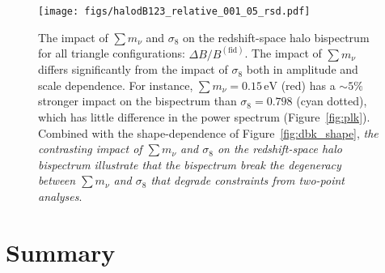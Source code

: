 \documentclass[12pt, letterpaper, preprint]{aastex62}
\newcommand{\smnu}{\sum m_\nu}
\newcommand{\sig}{\sigma_8}
\begin{document}
\begin{figure}
\begin{center}
\texttt{[image: figs/halodB123\_relative\_001\_05\_rsd.pdf]}
    \caption{The impact of $\smnu$ and $\sig$ on the redshift-space 
    halo bispectrum for all triangle configurations: $\Delta B/B^\mathrm{(fid)}$. 
    The impact of $\smnu$ differs significantly from the impact of $\sig$ 
    both in amplitude and scale dependence. For instance, $\smnu = 0.15\,\mathrm{eV}$ 
    (red) has a $\sim 5\%$ stronger impact on the bispectrum than $\sig = 0.798$ 
    (cyan dotted), which has little difference in the power spectrum (Figure~\ref{fig:plk}). 
    Combined with the shape-dependence of Figure~\ref{fig:dbk_shape}, {\em the 
    contrasting impact of $\smnu$ and $\sig$ on the redshift-space halo bispectrum 
    illustrate that the bispectrum break the degeneracy between $\smnu$
    and $\sig$ that degrade constraints from two-point analyses}. 
    }
\label{fig:dbk_amp}
\end{center}
\end{figure}


\section{Summary} 

%
\end{document}
